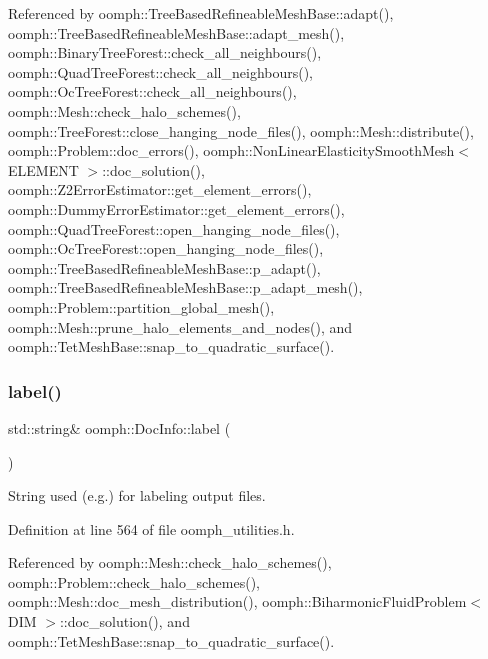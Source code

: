 Referenced by oomph\+::\+Tree\+Based\+Refineable\+Mesh\+Base\+::adapt(), oomph\+::\+Tree\+Based\+Refineable\+Mesh\+Base\+::adapt\+\_\+mesh(), oomph\+::\+Binary\+Tree\+Forest\+::check\+\_\+all\+\_\+neighbours(), oomph\+::\+Quad\+Tree\+Forest\+::check\+\_\+all\+\_\+neighbours(), oomph\+::\+Oc\+Tree\+Forest\+::check\+\_\+all\+\_\+neighbours(), oomph\+::\+Mesh\+::check\+\_\+halo\+\_\+schemes(), oomph\+::\+Tree\+Forest\+::close\+\_\+hanging\+\_\+node\+\_\+files(), oomph\+::\+Mesh\+::distribute(), oomph\+::\+Problem\+::doc\+\_\+errors(), oomph\+::\+Non\+Linear\+Elasticity\+Smooth\+Mesh$<$ E\+L\+E\+M\+E\+N\+T $>$\+::doc\+\_\+solution(), oomph\+::\+Z2\+Error\+Estimator\+::get\+\_\+element\+\_\+errors(), oomph\+::\+Dummy\+Error\+Estimator\+::get\+\_\+element\+\_\+errors(), oomph\+::\+Quad\+Tree\+Forest\+::open\+\_\+hanging\+\_\+node\+\_\+files(), oomph\+::\+Oc\+Tree\+Forest\+::open\+\_\+hanging\+\_\+node\+\_\+files(), oomph\+::\+Tree\+Based\+Refineable\+Mesh\+Base\+::p\+\_\+adapt(), oomph\+::\+Tree\+Based\+Refineable\+Mesh\+Base\+::p\+\_\+adapt\+\_\+mesh(), oomph\+::\+Problem\+::partition\+\_\+global\+\_\+mesh(), oomph\+::\+Mesh\+::prune\+\_\+halo\+\_\+elements\+\_\+and\+\_\+nodes(), and oomph\+::\+Tet\+Mesh\+Base\+::snap\+\_\+to\+\_\+quadratic\+\_\+surface().

\mbox{\label{classoomph_1_1DocInfo_a77320f779fab3075b36321aea72dc466}} 
\subsubsection{\texorpdfstring{label()}{label()}\hspace{0.1cm}{\footnotesize\ttfamily [1/2]}}
{\footnotesize\ttfamily std\+::string\& oomph\+::\+Doc\+Info\+::label (\begin{DoxyParamCaption}{ }\end{DoxyParamCaption})\hspace{0.3cm}{\ttfamily [inline]}}



String used (e.\+g.) for labeling output files. 



Definition at line 564 of file oomph\+\_\+utilities.\+h.



Referenced by oomph\+::\+Mesh\+::check\+\_\+halo\+\_\+schemes(), oomph\+::\+Problem\+::check\+\_\+halo\+\_\+schemes(), oomph\+::\+Mesh\+::doc\+\_\+mesh\+\_\+distribution(), oomph\+::\+Biharmonic\+Fluid\+Problem$<$ D\+I\+M $>$\+::doc\+\_\+solution(), and oomph\+::\+Tet\+Mesh\+Base\+::snap\+\_\+to\+\_\+quadratic\+\_\+surface().

